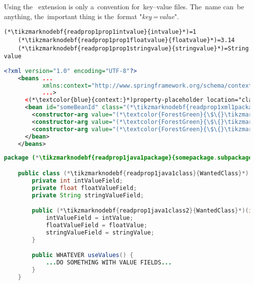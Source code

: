 \note Using the~ extension is only a~convention for~key--value files. The~name can~be anything, the~important thing is the~format "\textit{key\,=\,value}".
\newpage

\begin{lstlisting}[title={A \mboxtextit{.properties} file called \tikzmarknodebf{readprop1prop1filename}{\textit{constructor.properties}}}]
    (*\tikzmarknodebf{readprop1prop1intvalue}{intvalue}*)=1
    (*\tikzmarknodebf{readprop1prop1floatvalue}{floatvalue}*)=3.14
    (*\tikzmarknodebf{readprop1prop1stringvalue}{stringvalue}*)=String value
\end{lstlisting}
\begin{lstlisting}[language=XML, title={Configuration XML}]
    <?xml version="1.0" encoding="UTF-8"?>
    <beans ...
           xmlns:context="http://www.springframework.org/schema/context"
           ...>
      <(*\textcolor{blue}{context:}*)property-placeholder location="classpath:(*\tikzmarknodebf{readprop1xml1filename}{constructor.properties}[ForestGreen]*)" file-encoding="utf-8"/>
      <bean id="someBeanId" class="(*\tikzmarknodebf{readprop1xml1package}{somepackage.subpackage}[ForestGreen]*).(*\tikzmarknodebf{readprop1xml1class}{WantedClass}[ForestGreen]*)">
        <constructor-arg value="(*\textcolor{ForestGreen}{\$\{}\tikzmarknodebf{readprop1xml1intvalue}{intvalue}[ForestGreen]\textcolor{ForestGreen}{\}}*)"/>
        <constructor-arg value="(*\textcolor{ForestGreen}{\$\{}\tikzmarknodebf{readprop1xml1floatvalue}{floatvalue}[ForestGreen]\textcolor{ForestGreen}{\}}*)"/>
        <constructor-arg value="(*\textcolor{ForestGreen}{\$\{}\tikzmarknodebf{readprop1xml1stringvalue}{stringvalue}[ForestGreen]\textcolor{ForestGreen}{\}}*)"/>
      </bean>
    </beans>
\end{lstlisting}
\begin{lstlisting}[language=Java, title={Wanted class with the constructor}]
    package (*\tikzmarknodebf{readprop1java1package}{somepackage.subpackage}*);

    public class (*\tikzmarknodebf{readprop1java1class}{WantedClass}*) implements WantedInterface {
        private int intValueField;
        private float floatValueField;
        private String stringValueField;

        public (*\tikzmarknodebf{readprop1java1class2}{WantedClass}*)(int intValue, float floatValue, String stringValue) {
            intValueField = intValue;
            floatValueField = floatValue;
            stringValueField = stringValue;
        }

        public WHATEVER useValues() {
            ...DO SOMETHING WITH VALUE FIELDS...
        }
    }
\end{lstlisting}

